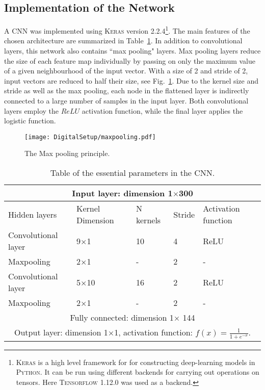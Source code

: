 \documentclass[main.tex]{subfiles}
\begin{document}
\subsection{Implementation of the Network}
A CNN was implemented using \textsc{Keras} version 2.2.4\footnote{\textsc{Keras} is a high level framework for for constructing deep-learning models in \textsc{Python}. It can be run using different backends for carrying out operations on tensors. Here \textsc{Tensorflow} 1.12.0 was used as a backend.}\cite{keras}. The main features of the chosen architecture are summarized in Table~\ref{tab:architecture}. In addition to convolutional layers, this network also contains ``max pooling" layers. Max pooling layers reduce the size of each feature map individually by passing on only the maximum value of a given neighbourhood of the input vector. With a size of 2 and stride of 2, input vectors are reduced to half their size, see Fig.~\ref{fig:maxpooking}. Due to the kernel size and stride as well as the max pooling, each node in the flattened layer is indirectly connected to a large number of samples in the input layer. Both convolutional layers employ the $ReLU$ activation function, while the final layer applies the logistic function.
\begin{figure}[ht!]
    \centering
        \texttt{[image: DigitalSetup/maxpooling.pdf]}
        \caption[The Max pooling principle.]{The Max pooling principle.}
    \label{fig:maxpooking} 
\end{figure}

\begin{table}[h]
\center
\begin{tabular}{|l|l|l|l|l|}
\hline
\multicolumn{5}{|c|}{Input layer: dimension 1$\times$300}                                            \\ \hline
Hidden layers       & Kernel Dimension & N kernels & Stride & Activation function \\ \hline
Convolutional layer & 9$\times$1           & 10                & 4             & ReLU                \\ \hline
Maxpooling          & 2$\times$1           & -                 & 2             & -                   \\ \hline
Convolutional layer & 5$\times$10           & 16                & 2             & ReLU                \\ \hline
Maxpooling          & 2$\times$1           & -                 & 2             & -                   \\ \hline
\multicolumn{5}{|c|}{Fully connected: dimension 1$\times$ 144}
\\ \hline
\multicolumn{5}{|c|}{Output layer: dimension 1$\times$1, activation function: 	$f(x) = \frac{1}{1+e^{-x}}$.
}               \\ \hline
\end{tabular}
\caption{Table of the essential parameters in the CNN.}
\label{tab:architecture}
\end{table}
\end{document}
